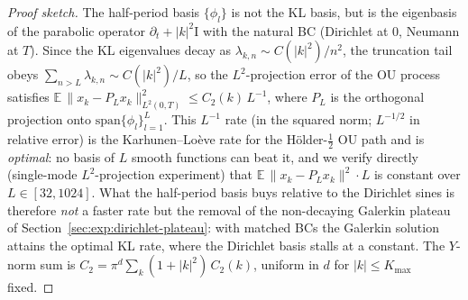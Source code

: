 \begin{proof}[Proof sketch]
The half-period basis $\{\phi_l\}$ is not the KL basis, but is the
eigenbasis of the parabolic operator $\partial_t + |k|^2 \mathrm{I}$
with the natural BC (Dirichlet at $0$, Neumann at $T$). Since the KL
eigenvalues decay as $\lambda_{k, n} \sim C(|k|^2)/n^2$, the truncation
tail obeys $\sum_{n > L} \lambda_{k, n} \sim C(|k|^2)/L$, so the
$L^2$-projection error of the OU process satisfies
$\mathbb{E}\,\|x_k - P_L x_k\|_{L^2(0, T)}^2 \le C_2(k)\,L^{-1}$,
where $P_L$ is the orthogonal projection onto $\mathrm{span}\{\phi_l\}_{l=1}^L$.
This $L^{-1}$ rate (in the squared norm; $L^{-1/2}$ in relative error)
is the Karhunen--Lo\`eve rate for the H\"older-$\tfrac12$ OU path and is
\emph{optimal}: no basis of $L$ smooth functions can beat it, and we
verify directly (single-mode $L^2$-projection experiment) that
$\mathbb{E}\,\|x_k - P_L x_k\|^2 \cdot L$ is constant over
$L \in [32, 1024]$. What the half-period basis buys relative to the
Dirichlet sines is therefore \emph{not} a faster rate but the removal of
the non-decaying Galerkin plateau of
Section~\ref{sec:exp:dirichlet-plateau}: with matched BCs the Galerkin
solution attains the optimal KL rate, where the Dirichlet basis stalls
at a constant. The $Y$-norm sum is
$C_2 = \pi^d \sum_{k} (1 + |k|^2)\,C_2(k)$, uniform in $d$ for
$|k| \le K_{\max}$ fixed.
\end{proof}

